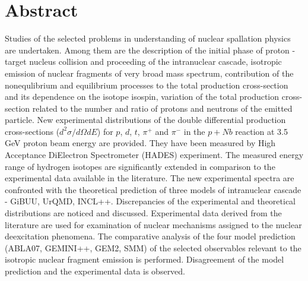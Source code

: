 \documentclass[12pt]{report}
\begin{document}

\tableofcontents
\chapter*{Abstract}

Studies of the selected problems in understanding of nuclear spallation physics are undertaken. Among them are the description of the initial phase of proton - target nucleus collision and proceeding of the intranuclear cascade, isotropic emission of nuclear fragments of very broad mass spectrum, contribution of the nonequlibrium and equilibrium processes to the total production cross-section and its dependence on the isotope isospin, 
variation of the total production cross-section related to the number and ratio of protons and neutrons of the  emitted particle. 
New experimental distributions of the double differential production cross-sections ($d^2\sigma/d\Omega dE$) for $p$,  $d$,  $t$, $\pi^{+}$ and $\pi^{-}$ in the $p+Nb$ reaction 
at 3.5 GeV proton beam energy are provided. They have been measured by High Acceptance DiElectron Spectrometer (HADES) experiment. The measured energy range of hydrogen isotopes 
are significantly extended in comparison to the experimental data available in the literature. The new experimental spectra are confronted with the theoretical prediction of three models of intranuclear cascade - GiBUU, UrQMD, INCL++. Discrepancies
of the experimental and theoretical distributions are noticed  and discussed. Experimental data derived from the literature are used for examination of nuclear mechanisms assigned to the nuclear deexcitation phenomena. The comparative analysis of the four model prediction (ABLA07, GEMINI++, GEM2, SMM) of the selected observables relevant to the isotropic nuclear fragment emission is performed. Disagreement of the model prediction and the experimental data is observed. 
\end{document}
